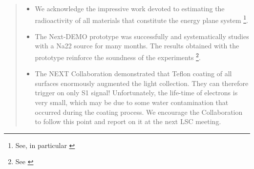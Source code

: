 \begin{quotation}
\begin{itemize}
efficiency \footnote{See  \cite{Alvarez:2012ub}}. 
\item We acknowledge the impressive work devoted to estimating the radioactivity of all materials that constitute the energy plane system \footnote{See, in particular \cite{Cebrian:2015jna}}.
\item The Next-DEMO prototype was successfully and systematically studies with a Na22 source for many months. The results obtained with the prototype reinforce the soundness of the experiments \footnote{ See  \cite{Alvarez:2012yxw, Alvarez:2012zsz,Alvarez:2012hu,Alvarez:2013gxa,Lorca:2014sra,Renner:2014mha,Serra:2014zda, Ferrario:2015kta}}.
\item The NEXT Collaboration demonstrated that Teflon coating of all surfaces enormously augmented the light collection. They can therefore trigger on only S1 signal! Unfortunately, the life-time of electrons is very small, which may be due to some water contamination that occurred during the coating process. We encourage the Collaboration to follow this point and report on it at the next LSC meeting.
\end{itemize}


\end{quotation}
